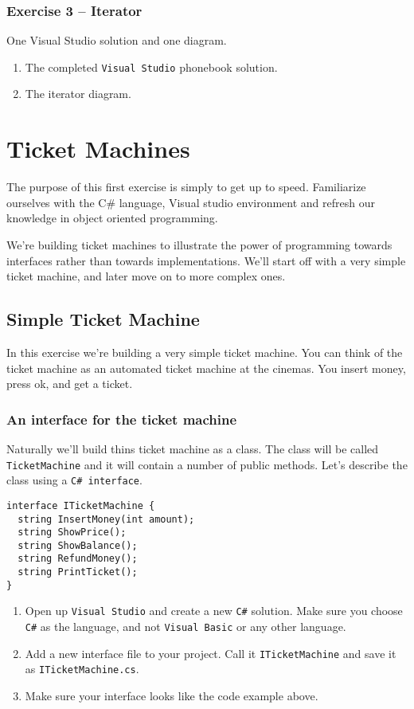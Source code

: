 \documentclass{article}
\newcounter{stepcounter}
\newenvironment{steps}{ 
  \begin{enumerate}[label=\color{red}Step \thesection-\theenumi)]
    \setcounter{enumi}{\value{stepcounter}}
}{
  \setcounter{stepcounter}{\value{enumi}}
  \end{enumerate}
}
\begin{document}
\subsubsection*{Exercise 3 -- Iterator}
One Visual Studio solution and one diagram.
\begin{enumerate}
  \item The completed \texttt{Visual Studio} phonebook solution.
  \item The iterator diagram.
\end{enumerate}








\setcounter{stepcounter}{0}
\pagebreak
\section{ Ticket Machines }
The purpose of this first exercise is simply to get up to speed. Familiarize ourselves with the C\# language, Visual studio environment and refresh our knowledge in object oriented programming.

We're building ticket machines to illustrate the power of programming towards interfaces rather than towards implementations. We'll start off with a very simple ticket machine, and later move on to more complex ones.

\subsection{Simple Ticket Machine}
In this exercise we’re building a very simple ticket machine. You can think of the ticket machine as an automated ticket machine at the cinemas. You insert money, press ok, and get a ticket.


\subsubsection{An interface for the ticket machine}
Naturally we'll build thins ticket machine as a class. The class will be called \texttt{TicketMachine} and it will contain a number of public methods. Let's describe the class using a \texttt{C\# interface}.

\begin{lstlisting}
interface ITicketMachine {
  string InsertMoney(int amount);
  string ShowPrice();
  string ShowBalance();
  string RefundMoney();
  string PrintTicket();
}
\end{lstlisting}
\begin{steps}
\item Open up \texttt{Visual Studio} and create a new \texttt{C\#} solution. Make sure you choose \texttt{C\#} as the language, and not \texttt{Visual Basic} or any other language.
\item Add a new interface file to your project. Call it \texttt{ITicketMachine} and save it as \texttt{ITicketMachine.cs}.
\item Make sure your interface looks like the code example above.
\end{steps}
\end{document}
